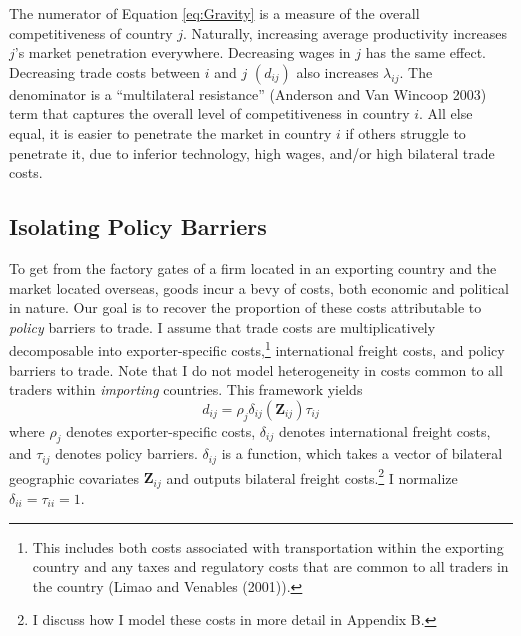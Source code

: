 \documentclass{puthesis}
\begin{document}
The numerator of Equation \ref{eq:Gravity} is a measure of the overall
competitiveness of country \(j\). Naturally, increasing average
productivity increases \(j\)'s market penetration everywhere. Decreasing
wages in \(j\) has the same effect. Decreasing trade costs between \(i\)
and \(j\) \((d_{ij})\) also increases \(\lambda_{ij}\). The denominator
is a ``multilateral resistance'' (Anderson and Van Wincoop 2003) term
that captures the overall level of competitiveness in country \(i\). All
else equal, it is easier to penetrate the market in country \(i\) if
others struggle to penetrate it, due to inferior technology, high wages,
and/or high bilateral trade costs.

\subsection{Isolating Policy Barriers}

To get from the factory gates of a firm located in an exporting country
and the market located overseas, goods incur a bevy of costs, both
economic and political in nature. Our goal is to recover the proportion
of these costs attributable to \emph{policy} barriers to trade. I assume
that trade costs are multiplicatively decomposable into
exporter-specific costs,\footnote{This includes both costs associated
  with transportation within the exporting country and any taxes and
  regulatory costs that are common to all traders in the country (Limao
  and Venables (2001)).} international freight costs, and policy
barriers to trade. Note that I do not model heterogeneity in costs
common to all traders within \emph{importing} countries. This framework
yields \begin{equation} \label{eq:tcosts}
d_{ij} = \rho_j \delta_{ij}(\bm{Z}_{ij}) \tau_{ij}
\end{equation} where \(\rho_j\) denotes exporter-specific costs,
\(\delta_{ij}\) denotes international freight costs, and \(\tau_{ij}\)
denotes policy barriers. \(\delta_{ij}\) is a function, which takes a
vector of bilateral geographic covariates \(\bm{Z}_{ij}\) and outputs
bilateral freight costs.\footnote{I discuss how I model these costs in
  more detail in Appendix B.} I normalize
\(\delta_{ii} = \tau_{ii} = 1\).
\end{document}
